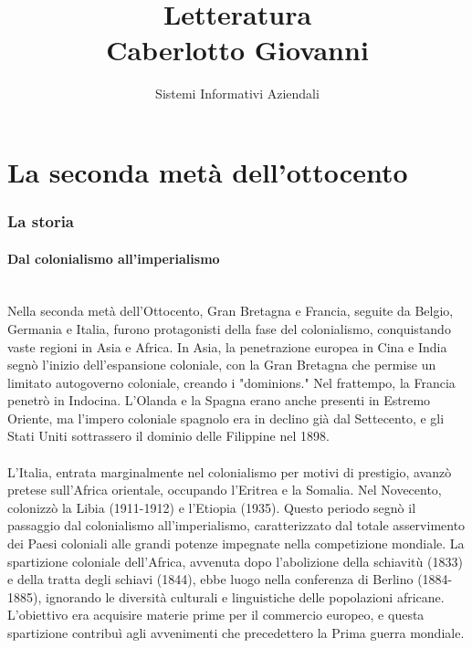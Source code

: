 \documentclass{report}
\title{\Huge{Letteratura}\\Caberlotto Giovanni}
\author{\huge{Sistemi Informativi Aziendali}}
\date{}
\begin{document}
\maketitle
\newpage%
\tableofcontents
\pagebreak

\chapter{La seconda metà dell'ottocento} %
\label{chap:La seconda metà dell'ottocento}

\subsection{La storia}
\subsubsection{Dal colonialismo all'imperialismo}
\\
Nella seconda metà dell'Ottocento, Gran Bretagna e Francia, seguite da Belgio, Germania e Italia, furono protagonisti della fase del colonialismo, conquistando vaste regioni in Asia e Africa. In Asia, la penetrazione europea in Cina e India segnò l'inizio dell'espansione coloniale, con la Gran Bretagna che permise un limitato autogoverno coloniale, creando i "dominions." Nel frattempo, la Francia penetrò in Indocina. L'Olanda e la Spagna erano anche presenti in Estremo Oriente, ma l'impero coloniale spagnolo era in declino già dal Settecento, e gli Stati Uniti sottrassero il dominio delle Filippine nel 1898.
\\
\\
L'Italia, entrata marginalmente nel colonialismo per motivi di prestigio, avanzò pretese sull'Africa orientale, occupando l'Eritrea e la Somalia. Nel Novecento, colonizzò la Libia (1911-1912) e l'Etiopia (1935). Questo periodo segnò il passaggio dal colonialismo all'imperialismo, caratterizzato dal totale asservimento dei Paesi coloniali alle grandi potenze impegnate nella competizione mondiale. La spartizione coloniale dell'Africa, avvenuta dopo l'abolizione della schiavitù (1833) e della tratta degli schiavi (1844), ebbe luogo nella conferenza di Berlino (1884-1885), ignorando le diversità culturali e linguistiche delle popolazioni africane. L'obiettivo era acquisire materie prime per il commercio europeo, e questa spartizione contribuì agli avvenimenti che precedettero la Prima guerra mondiale.
\\
\end{document}

